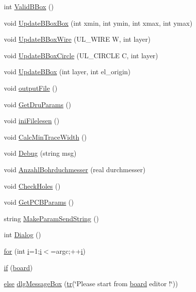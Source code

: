 \begin{DoxyCompactItemize}
\item 
int \hyperlink{_l_p-_daten_8ulp_a1f050630d9c3410f1ac43406a24a5e33}{Valid\+B\+Box} ()
\item 
void \hyperlink{_l_p-_daten_8ulp_ae90291a71737dab9c0edea7b1e423923}{Update\+B\+Box\+Box} (int xmin, int ymin, int xmax, int ymax)
\item 
void \hyperlink{_l_p-_daten_8ulp_a5e9c79cd67f69298427ae82f1510149c}{Update\+B\+Box\+Wire} (U\+L\+\_\+\+W\+I\+R\+E W, int layer)
\item 
void \hyperlink{_l_p-_daten_8ulp_a75de752e74b93af1c8174c197922f272}{Update\+B\+Box\+Circle} (U\+L\+\_\+\+C\+I\+R\+C\+L\+E C, int layer)
\item 
void \hyperlink{_l_p-_daten_8ulp_a4c987c556c39e5a35ddc2211fb6c7c52}{Update\+B\+Box} (int layer, int el\+\_\+origin)
\item 
void \hyperlink{_l_p-_daten_8ulp_ad8b5b71882655336c5922f7ea6b7748a}{output\+File} ()
\item 
void \hyperlink{_l_p-_daten_8ulp_a4bd3198d4d91f76fc1ac044aa8c2b6aa}{Get\+Dru\+Params} ()
\item 
void \hyperlink{_l_p-_daten_8ulp_a5155b4a449afb07c498f38fcc879cb9d}{ini\+Filelesen} ()
\item 
void \hyperlink{_l_p-_daten_8ulp_a318b236ebcfbe41e135c04720ee437d0}{Calc\+Min\+Trace\+Width} ()
\item 
void \hyperlink{_l_p-_daten_8ulp_ac910cb5042d04372ec6085fe3b09fc4e}{Debug} (string msg)
\item 
void \hyperlink{_l_p-_daten_8ulp_aab6096d92ccc824254137b8922988926}{Anzahl\+Bohrduchmesser} (real durchmesser)
\item 
void \hyperlink{_l_p-_daten_8ulp_a87da447639bc086662c1bff4b3de9d15}{Check\+Holes} ()
\item 
void \hyperlink{_l_p-_daten_8ulp_a8f80d61ddcff9c113e0955efae32e6a4}{Get\+P\+C\+B\+Params} ()
\item 
string \hyperlink{_l_p-_daten_8ulp_a5786eace1270a3165b62145daf1d22f3}{Make\+Param\+Send\+String} ()
\item 
int \hyperlink{_l_p-_daten_8ulp_ac91564ebad2e5a0960ae2e9c60527870}{Dialog} ()
\item 
\hyperlink{_l_p-_daten_8ulp_a5726da467a0746af58b80a5af5c20b58}{for} (int \hyperlink{test_8ulp_acb559820d9ca11295b4500f179ef6392}{i}=1;\hyperlink{test_8ulp_acb559820d9ca11295b4500f179ef6392}{i}$<$=argc;++\hyperlink{test_8ulp_acb559820d9ca11295b4500f179ef6392}{i})
\item 
\hyperlink{_l_p-_daten_8ulp_a9c774614d2743abf2ebe6a8a15d7fa6d}{if} (\hyperlink{layer-change_8ulp_a3139e18cbc64a26859cbd2749be11ced}{board})
\item 
\hyperlink{text_8ulp_a0544c3fe466e421738dae463968b70ba}{else} \hyperlink{_l_p-_daten_8ulp_a9a9b6799eeeaeb061d7aa5bed52bf99b}{dlg\+Message\+Box} (\hyperlink{_l_p-_daten_8ulp_a47e53f1f76c0dfceedc0401335138268}{tr}(\char`\"{}Please start from \hyperlink{layer-change_8ulp_a3139e18cbc64a26859cbd2749be11ced}{board} editor !\char`\"{}))
\end{DoxyCompactItemize}

